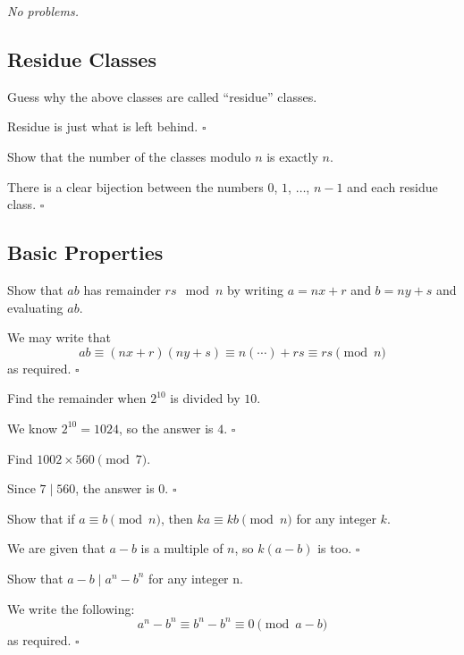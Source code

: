 \documentclass{article}
\newcommand{\noproblems}{\emph{No problems.}}
\begin{document}
\noproblems

\subsection{Residue Classes}

\begin{problem}[2.3.1]{}
Guess why the above classes are called ``residue'' classes.
\end{problem}
Residue is just what is left behind. $\square$

\begin{problem}[2.3.2]{}
Show that the number of the classes modulo $n$ is exactly $n$.
\end{problem}
There is a clear bijection between the numbers $0$, $1$, $\dots$, $n-1$ and each residue class. $\square$

\subsection{Basic Properties}

\begin{problem}[2.4.1]{}
Show that $ab$ has remainder $rs \mod n$ by writing $a = nx+r$ and $b = ny+s$ and evaluating $ab$.
\end{problem}
We may write that \[ab \equiv (nx+r)(ny+s) \equiv n(\cdots)+rs \equiv rs \pmod{n}\] as required. $\square$

\begin{problem}[2.4.2]{}
Find the remainder when $2^{10}$ is divided by $10$.
\end{problem}
We know $2^{10} = 1024$, so the answer is $4$. $\square$

\begin{problem}[2.4.3]{}
Find $1002 \times 560 \pmod{7}$.
\end{problem}
Since $7 \mid 560$, the answer is $0$. $\square$

\begin{problem}[2.4.4]{}
Show that if $a \equiv b \pmod{n}$, then $ka \equiv kb \pmod{n}$ for any integer $k$.
\end{problem}
We are given that $a-b$ is a multiple of $n$, so $k(a-b)$ is too. $\square$

\begin{problem}[2.4.5]{}
Show that $a - b \mid a^n - b^n$ for any integer n.
\end{problem}
We write the following: \[a^n-b^n \equiv b^n-b^n \equiv 0\pmod{a-b}\] as required. $\square$
\end{document}
